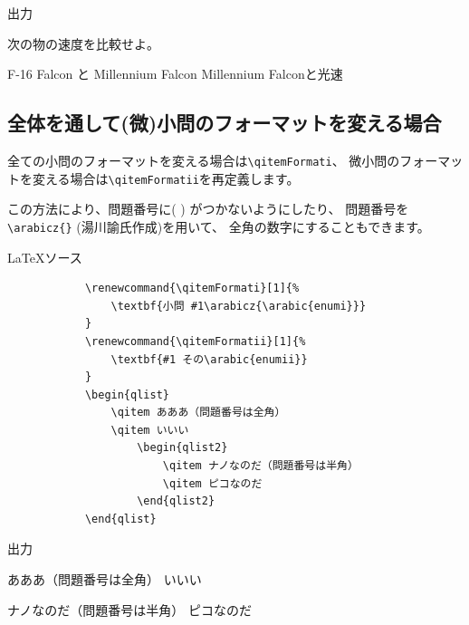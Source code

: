 \documentclass[dvipdfmx,a4j,11pt]{jarticle}
\newenvironment{inputbox}{%
	\begin{itembox}[r]{\LaTeX ソース}
}{
	\end{itembox}
}
\newenvironment{outputbox}{%
	\begin{itembox}[r]{出力}
}{%
	\end{itembox}
}
\begin{document}
	\begin{outputbox}
		\begin{qlist}
		    \qitem 次の物の速度を比較せよ。
		        \begin{qlist2}
		            \qitem F-16 Falcon と Millennium Falcon
		            \qitem Millennium Falconと光速
		        \end{qlist2}
		\end{qlist}
	\end{outputbox}
	


\subsection{全体を通して(微)小問のフォーマットを変える場合}
	全ての小問のフォーマットを変える場合は{\tt \verb"\qitemFormati"}、
	微小問のフォーマットを変える場合は{\tt \verb"\qitemFormatii"}を再定義します。
	
	この方法により、問題番号に( ) がつかないようにしたり、
	問題番号を\verb"\arabicz{}" (湯川諭氏作成)を用いて、
	全角の数字にすることもできます。
	\begin{inputbox}
		\begin{verbatim}
			\renewcommand{\qitemFormati}[1]{%
			    \textbf{小問 #1\arabicz{\arabic{enumi}}}
			}
			\renewcommand{\qitemFormatii}[1]{%
			    \textbf{#1 その\arabic{enumii}}
			}
			\begin{qlist}
			    \qitem あああ（問題番号は全角）
			    \qitem いいい
			        \begin{qlist2}
			            \qitem ナノなのだ（問題番号は半角）
			            \qitem ピコなのだ
			        \end{qlist2}
			\end{qlist}
		\end{verbatim}
	\end{inputbox}
	
	\begin{outputbox}
		\hspace{5mm}
		\begin{minipage}{0.9\linewidth}
                        \renewcommand{\qitemFormati}[1]{%
                        		\textbf{小問 #1\arabicz{\arabic{enumi}}}
                        }
                        \renewcommand{\qitemFormatii}[1]{%
                        		\textbf{#1 その\arabic{enumii}}
                        }
			\begin{qlist}
				\qitem あああ（問題番号は全角）
				\qitem いいい
					\begin{qlist2}
						\qitem ナノなのだ（問題番号は半角）
						\qitem ピコなのだ
					\end{qlist2}
			\end{qlist}
		\end{minipage}
	\end{outputbox}
\end{document}
